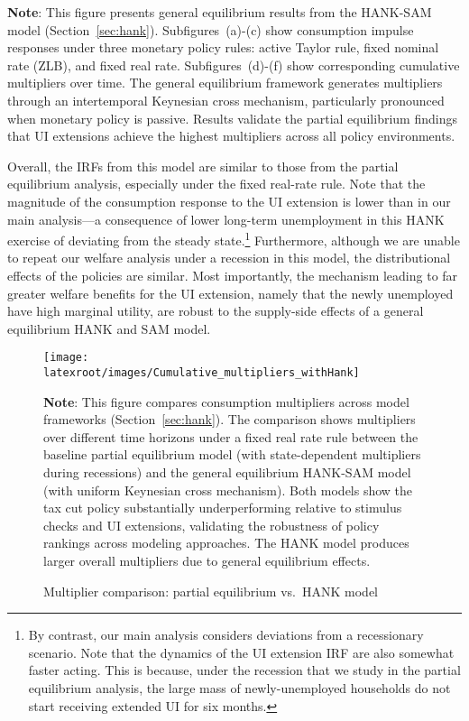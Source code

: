 \documentclass[qe]{econsocart}
\begin{document}
\noindent\parbox{\textwidth}{\footnotesize
  \textbf{Note}: This figure presents general equilibrium results from the HANK-SAM model (Section~\ref{sec:hank}).
  Subfigures~(a)-(c) show consumption impulse responses under three monetary policy rules:
  active Taylor rule, fixed nominal rate (ZLB), and fixed real rate.
  Subfigures~(d)-(f) show corresponding cumulative multipliers over time.
  The general equilibrium framework generates multipliers through an intertemporal Keynesian cross mechanism,
  particularly pronounced when monetary policy is passive.
  Results validate the partial equilibrium findings that UI extensions achieve the highest multipliers
  across all policy environments.
}

\vspace{1em}  %

Overall, the IRFs from this model are similar to those from the partial equilibrium analysis, especially under the fixed real-rate rule. Note that the magnitude of the consumption response to the UI extension is lower than in our main analysis---a consequence of lower long-term unemployment in this HANK exercise of deviating from the steady state.\footnote{By contrast, our main analysis considers deviations from a recessionary scenario. Note that the dynamics of the UI extension IRF are also somewhat faster acting.
  This is because, under the recession that we study in the partial equilibrium analysis, the large mass of newly-unemployed households do not start receiving extended UI for six months.
} Furthermore, although we are unable to repeat our welfare analysis under a recession in this model, the distributional effects of the policies are similar.
Most importantly, the mechanism leading to far greater welfare benefits for the UI extension, namely that the newly unemployed have high marginal utility, are robust to the supply-side effects of a general equilibrium HANK and SAM model.

\begin{figure}[htb] 
  \centering
  \caption{Multiplier comparison: partial equilibrium vs.\ HANK model}
  \label{fig:HANK_multipliers} 
  \texttt{[image: \\latexroot/images/Cumulative\_multipliers\_withHank]}

  \medskip
  \noindent\parbox{\textwidth}{\footnotesize
    \textbf{Note}: This figure compares consumption multipliers across model frameworks (Section~\ref{sec:hank}).
    The comparison shows multipliers over different time horizons under a fixed real rate rule
    between the baseline partial equilibrium model (with state-dependent multipliers during recessions)
    and the general equilibrium HANK-SAM model (with uniform Keynesian cross mechanism).
    Both models show the tax cut policy substantially underperforming relative to stimulus checks
    and UI extensions, validating the robustness of policy rankings across modeling approaches.
    The HANK model produces larger overall multipliers due to general equilibrium effects.
  }
\end{figure}
\end{document}
